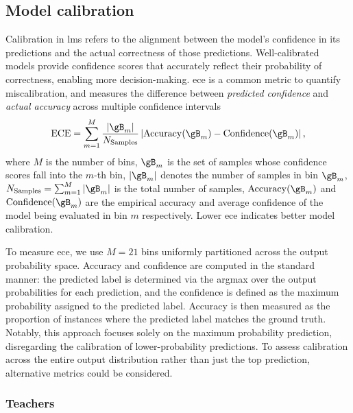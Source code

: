\newcommand{\calwidth}{0.48\textwidth}

\subsection{Model calibration}
\label{ssec:model-calibration}

Calibration in \gls{lm}s refers to the alignment between the model’s confidence in its predictions and the actual correctness of those predictions. 
Well-calibrated models provide confidence scores that accurately reflect their probability of correctness, enabling more decision-making. 
\gls{ece} is a common metric to quantify miscalibration, and measures the difference between \emph{predicted confidence} and \emph{actual accuracy} across multiple confidence intervals
\begin{align}\label{eq:ece}
	\mathrm{ECE} =
    \sum_{m=1}^{M} \frac{|\gB_m|}{N_{\mathrm{Samples}}} \left| \mathrm{Accuracy}(\gB_m) - \mathrm{Confidence}(\gB_m) \right|,
\end{align}
where $M$ is the number of bins,
$\gB_m$ is the set of samples whose confidence scores fall into the $m$-th bin, 
$|\gB_m|$ denotes the number of samples in bin $\gB_m$, 
$N_{\mathrm{Samples}}=\sum_{m=1}^M|\gB_m|$ is the total number of samples, 
$\mathrm{Accuracy}(\gB_m)$ and 
$\mathrm{Confidence}(\gB_m)$ are the empirical accuracy and average confidence of the model being evaluated in bin $m$ respectively.
Lower \gls{ece} indicates better model calibration.




To measure \gls{ece}, we use $M=21$ bins uniformly partitioned across the output probability space. Accuracy and confidence are computed in the standard manner: the predicted label is determined via the argmax over the output probabilities for each prediction, and the confidence is defined as the maximum probability assigned to the predicted label. Accuracy is then measured as the proportion of instances where the predicted label matches the ground truth. Notably, this approach focuses solely on the maximum probability prediction, disregarding the calibration of lower-probability predictions. To assess calibration across the entire output distribution rather than just the top prediction, alternative metrics could be considered.

\subsubsection{Teachers}
\label{sssec:teachers}

